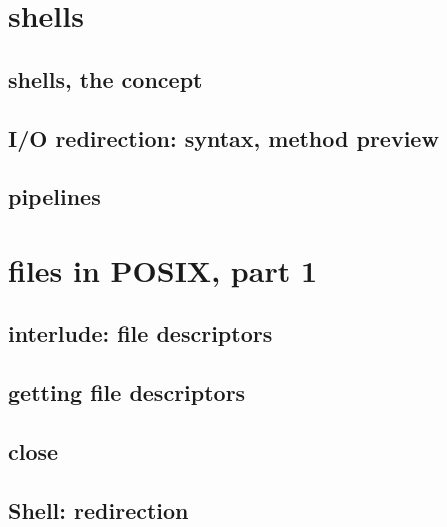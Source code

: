 

\section{shells}

\subsection{shells, the concept}



\subsection{I/O redirection: syntax, method preview}


\subsection{pipelines}


\section{files in POSIX, part 1}

\subsection{interlude: file descriptors}





\subsection{getting file descriptors}



\subsection{close}



\subsection{Shell: redirection}

